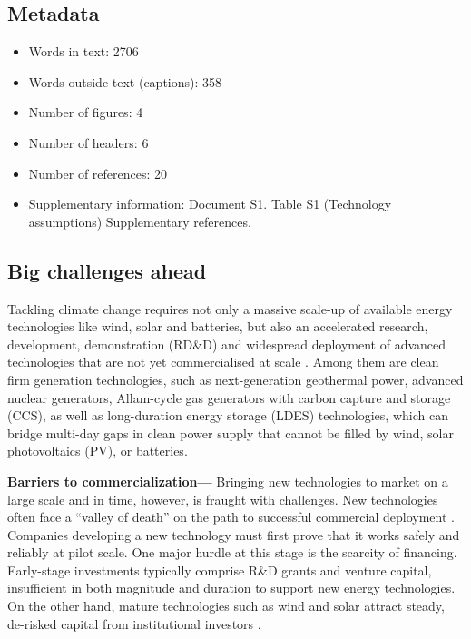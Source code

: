 \documentclass[pdflatex,sn-basic, Numbered]{sn-jnl}
\theoremstyle{thmstyleone}%
\theoremstyle{thmstyletwo}%
\theoremstyle{thmstylethree}%
\begin{document}
\subsection*{Metadata}
\begin{itemize}
    \item Words in text: 2706
    \item Words outside text (captions): 358
    \item Number of figures: 4
    \item Number of headers: 6
    \item Number of references: 20
    \item Supplementary information: Document S1. Table S1 (Technology assumptions) Supplementary references.
\end{itemize}



\maketitle

\subsection*{Big challenges ahead}\label{sec1}

Tackling climate change requires not only a massive scale-up of available energy technologies like wind, solar and batteries, but also an accelerated research, development, demonstration (RD\&D) and widespread deployment of advanced technologies that are not yet commercialised at scale \cite{sepulvedaRoleFirmLowCarbon2018, brownUltralongdurationEnergyStorage2023}.
Among them are clean firm generation technologies, such as next-generation geothermal power, advanced nuclear generators, Allam-cycle gas generators with carbon capture and storage (CCS), as well as long-duration energy storage (LDES) technologies, which can bridge multi-day gaps in clean power supply that cannot be filled by wind, solar photovoltaics (PV), or batteries.

\textbf{Barriers to commercialization---} Bringing new technologies to market on a large scale and in time, however, is fraught with challenges.
New technologies often face a \enquote{valley of death} on the path to successful commercial deployment \cite{google-advancedtech}.
Companies developing a new technology must first prove that it works safely and reliably at pilot scale.
One major hurdle at this stage is the scarcity of financing. Early-stage investments typically comprise R\&D grants and venture capital, insufficient in both magnitude and duration to support new energy technologies. On the other hand, mature technologies such as wind and solar attract steady, de-risked capital from institutional investors \cite{khatcherianBarriersTimelyDeployment2022}.
\end{document}

